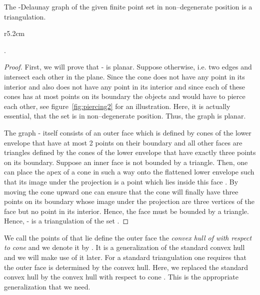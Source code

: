 \documentclass{stacs_proc}
\begin{document}
\begin{lemma}
  \label{lem:tria}
  The -Delaunay graph of the given finite point set  in
  non--degenerate position is a triangulation.  
\end{lemma}
\begin{wrapfigure}[13]{r}{5.2cm}
    \vspace{-4ex}
  \begin{center}
    \caption{Two intersecting -Delaunay edges and their defining
      objects} 
    \label{fig:piercing2}
  \end{center}
\end{wrapfigure}
.\vspace{-4ex}
\begin{proof}
  First, we will prove that - is planar. Suppose
  otherwise, i.e. two edges  and  intersect each
  other in the plane. Since the cone  does not have any point
  in its interior and  also does not have any point in its
  interior and since each of these cones has at most  points on its
  boundary the objects  and  would have to
  pierce each other, see figure~\ref{fig:piercing2} for an
  illustration. Here, it is actually essential, that the set  is in
  non--degenerate position. Thus, the graph is planar. 

  The graph - itself consists of an outer face which is
  defined by cones of the lower envelope that have at most 2 points on
  their boundary and all other faces are triangles defined by the
  cones of the lower envelope that have exactly three points on its
  boundary.  
  Suppose an inner face  is not bounded by a triangle. Then, one
  can place the apex of a cone in such a way onto the flattened lower
  envelope such that its image under the projection  is a point
  which lies inside this face . By moving the cone upward one can
  ensure that the cone will finally have three points on its boundary
  whose image under the projection  are three vertices of the face
   but no point in its interior. Hence, the face  must be
  bounded by a triangle.   
  Hence, - is a triangulation of the set . 
\end{proof}

We call the points of  that lie define the outer face the
\emph{convex hull of  with respect to cone } and we denote it by
. 
It is a generalization of the standard convex hull and we will make
use of it later. 
For a standard triangulation one requires that the outer face is
determined by the convex hull. Here, we replaced the standard convex
hull by the convex hull with respect to cone . This is the
appropriate generalization that we need.  
\end{document}
